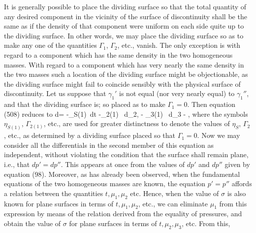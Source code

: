 \documentclass[12pt]{memoir}
\begin{document}
{It is generally possible to place the dividing surface so that the total quantity of any desired component in the vicinity of the surface of discontinuity shall be the same as if the density of that component were uniform on each side quite up to the dividing surface. In other words, we may place the dividing surface so as to make any one of the quantities $\Gamma_1$, $\Gamma_2$, etc., vanish. The only exception is with regard to a component which has the same density in the two homogeneous masses. With regard to a component which has very nearly the same density in the two masses such a location of the dividing surface might be objectionable, as the dividing surface might fail to coincide sensibly with the physical surface of discontinuity. Let us suppose that $\gamma_1'$ is not equal (nor very nearly equal) to $\gamma_1''$, and that the dividing surface is; so placed as to make $\Gamma_1=0$. Then equation (508) reduces to
\eqs d\sigma = -\eta_{S(1)}\, dt -\Gamma_{2(1)} \, d\mu_2, - \Gamma_{3(1)} \, d\mu_3 - , \label{514}\eqe
where the symbols $\eta_{S(1)}$, $\Gamma_{2(1)}$, etc., are used for greater distinctness to denote the values of $\eta_S$, $\Gamma_2$, etc., as determined by a dividing surface placed so that $\Gamma_1=0$. Now we may consider all the differentials in the second member of this equation as independent, without violating the condition that the surface shall remain plane, i.e., that $dp'=dp''$. This appears at once from the values of $dp'$ and $dp''$ given by equation (98).  Moreover, as has already been observed, when the fundamental equations of the two homogeneous masses are known, the equation $p'=p''$ affords a relation between the quantities $t, \mu_1, \mu_2$ etc. Hence, when the value of $\sigma$ is also known for plane surfaces in terms of  $t, \mu_1, \mu_2$, etc., we can eliminate $\mu_1$ from  this expression by means of the relation derived from the equality of pressures, and obtain the value of $\sigma$ for plane surfaces in terms of $t, \mu_2,\mu_3$, etc. From  this,
}
\end{document}

